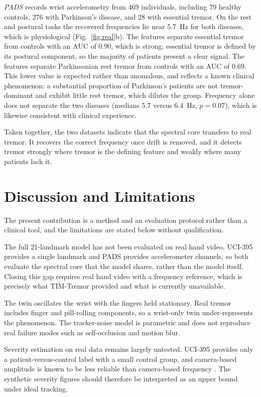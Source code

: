 \documentclass[conference]{IEEEtran}
\begin{document}
\emph{PADS} records wrist accelerometry from 469 individuals, including 79 healthy
controls, 276 with Parkinson's disease, and 28 with essential tremor. On the rest
and postural tasks the recovered frequencies lie near 5.7~Hz for both diseases,
which is physiological (Fig.~\ref{fig:real}b). The features separate essential
tremor from controls with an AUC of 0.90, which is strong; essential tremor is
defined by its postural component, so the majority of patients present a clear
signal. The features separate Parkinsonian rest tremor from controls with an AUC of
0.69. This lower value is expected rather than anomalous, and reflects a known
clinical phenomenon: a substantial proportion of Parkinson's patients are not
tremor-dominant and exhibit little rest tremor, which dilutes the group. Frequency
alone does not separate the two diseases (medians 5.7 versus 6.4~Hz, $p=0.07$),
which is likewise consistent with clinical experience.

Taken together, the two datasets indicate that the spectral core transfers to real
tremor. It recovers the correct frequency once drift is removed, and it detects
tremor strongly where tremor is the defining feature and weakly where many patients
lack it.

\section{Discussion and Limitations}
The present contribution is a method and an evaluation protocol rather than a
clinical tool, and the limitations are stated below without qualification.

The full 21-landmark model has not been evaluated on real hand video. UCI-395
provides a single landmark and PADS provides accelerometer channels, so both
evaluate the spectral core that the model shares, rather than the model itself.
Closing this gap requires real hand video with a frequency reference, which is
precisely what TIM-Tremor provided and what is currently unavailable.

The twin oscillates the wrist with the fingers held stationary. Real tremor
includes finger and pill-rolling components, so a wrist-only twin under-represents
the phenomenon. The tracker-noise model is parametric and does not reproduce real
failure modes such as self-occlusion and motion blur.

Severity estimation on real data remains largely untested. UCI-395 provides only a
patient-versus-control label with a small control group, and camera-based amplitude
is known to be less reliable than camera-based frequency \cite{wolke2025}. The
synthetic severity figures should therefore be interpreted as an upper bound under
ideal tracking.
\end{document}
